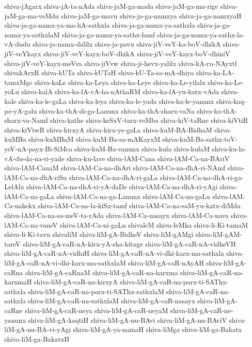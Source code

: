 {shiva-jAgarx
shiva-jA-ta-nAda
shiva-jaM-ga-mada
shiva-jaM-ga-ma-rige
shiva-jaM-ga-ma-veMdu
shiva-jaM-ga-mavu
shiva-ja-ga-namxya
shiva-ja-ga-namxyaH
shiva-ja-ga-namx-ya-ma-hA-sathxla
shiva-ja-ga-namx-ya-sathxla
shiva-ja-ga-namx-ya-sathxlaM
shiva-ja-ga-namx-ya-sathx-lamf
shiva-ja-ga-namx-ya-sathx-la-vA-dudu
shiva-ja-namx-dalilx
shiva-ja-pavu
shiva-jiV-veY-ka-boV-dhikA
shiva-jiV-veYkayx
shiva-jiV-veY-kayx-boV-dhikA
shiva-jiV-veY-kayx-boV-dhiniV
shiva-jiV-veY-kayx-meVva
shiva-jiVvw
shiva-ji-hevx-yalilx
shiva-kA-ru-NAyxtf
shivakArxR
shiva-kUTa
shiva-kUTaH
shiva-kU-Ta-sa-mA-dhiya
shiva-ka-LA-tamxMge
shiva-kaLe
shiva-ka-Leya
shiva-ka-Leye
shiva-ka-Le-yilalx
shiva-ka-Le-yoLu
shiva-kalA
shiva-ka-lA-vA-ha-nAthaRM
shiva-ka-lA-yu-katx-vAda
shiva-kale
shiva-ka-le-gaLa
shiva-ka-leya
shiva-ka-le-yada
shiva-ka-le-yanunx
shiva-kaq-pe-yA-galu
shiva-ka-thA-di-ga-Lanunx
shiva-ka-thA-sharx-vaNa
shiva-ka-thA-sharx-va-Namf
shiva-kathe
shiva-keSxV-tarx-veMba
shiva-kiV-taRne
shiva-kiVtiR
shiva-kiVtwR
shiva-kirxyA
shiva-kirx-ye-gaLa
shiva-kuM-BA-BidhaM
shiva-kuMBa
shiva-kuMBaM
shiva-kuM-Ba-sa-mAKayxM
shiva-kuM-Ba-sathx-toV-yeV-nA-payx-Bi-SiMca
shiva-kuM-Ba-vanunx
shiva-kula
shiva-kulaM
shiva-ku-la-vA-du-da-na-ri-yade
shiva-ku-lave
shiva-lAM-Cana
shiva-lAM-Ca-na-BAriV
shiva-lAM-CanaM
shiva-lAM-Ca-na-dhAri
shiva-lAM-Ca-na-dhA-ri-NAmf
shiva-lAM-Ca-na-dhA-riSu
shiva-lAM-Ca-na-dhA-ri-gaLa
shiva-lAM-Ca-na-dhA-ri-ga-LelAlx
shiva-lAM-Ca-na-dhA-ri-yA-daDe
shiva-lAM-Ca-na-dhA-ri-yAgi
shiva-lAM-Ca-na-gaLa
shiva-lAM-Ca-na-ga-Lanunx
shiva-lAM-Ca-na-gaLu
shiva-lAM-Ca-nakekx
shiva-lAM-Ca-na-la-kiSx-tamf
shiva-lAM-Ca-na-saM-yu-katx-diMda
shiva-lAM-Ca-na-sa-meV-ta-rAda
shiva-lAM-Ca-nasayx
shiva-lAM-Ca-nava
shiva-lAM-Ca-na-vaneV
shiva-lAM-Ca-ni-gaLu
shivaleM
shiva-leMka
shiva-li-Ki-tamaM
shiva-li-Ki-tavu
shivaliM
shiva-liM-gA-BidheV
shiva-liM-gAMgi
shiva-liM-gAM-tareV
shiva-liM-gA-caR-nA-kirx-yA-sha-kitxge
shiva-liM-gA-caR-nA-vidheVH
shiva-liM-gA-caR-nA-vidhiH
shiva-liM-gA-caR-nA-vi-dhi-karx-ma-sathxla
shiva-liM-gA-caR-nA-vi-dhi-karx-ma-sathxlaM
shiva-liM-gA-caR-nAyAH
shiva-liM-gA-caRna
shiva-liM-gA-caRnaM
shiva-liM-gA-caR-na-karxma
shiva-liM-gA-caR-na-karxmaH
shiva-liM-gA-caR-na-kirxyA
shiva-liM-gA-caR-na-parx-ti-SAThx-sathxla
shiva-liM-gA-caR-na-parx-ti-SAThx-sathxlaM
shiva-liM-gA-caR-na-sathxla
shiva-liM-gA-caR-na-sathxlaM
shiva-liM-gA-caR-nasayx
shiva-liM-gA-caRne
shiva-liM-gA-caR-neya
shiva-liM-gA-caR-neyaM
shiva-liM-gA-caR-ne-yanunx
shiva-liM-gA-kaqtiH
shiva-liM-gA-nu-BAvi
shiva-liM-gA-nu-BAviV
shiva-liM-gA-nu-BA-vi-yAgi
shiva-liM-gA-ya-namaH
shiva-liMga
shiva-liM-ga-Bakatx
shiva-liM-ga-BakatxH
}
